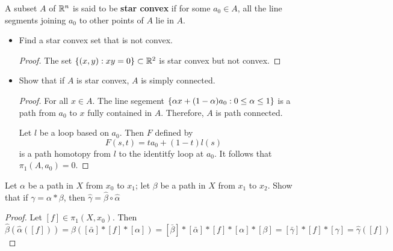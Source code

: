 \documentclass[12pt,a4paper]{article}
\begin{document}
    \begin{ex}
        A subset $A$ of $\mathbb{R}^n$ is said to be \textbf{star convex} if for some $a_0\in A$, all the line segments joining $a_0$ to other points of $A$ lie in $A$.
        \begin{itemize}
            \item Find a star convex set that is not convex.
            \begin{proof}
                The set $\left\{ (x,y):xy=0 \right\}\subset\mathbb{R}^2$ is star convex but not convex.
            \end{proof}
            \item Show that if $A$ is star convex, $A$ is simply connected.
            \begin{proof}
                For all $x\in A$. The line segement $\left\{ \alpha x+(1-\alpha)a_0:0\leq\alpha\leq1 \right\}$ is a path from $a_0$ to $x$ fully contained in $A$. Therefore, $A$ is path connected.

                Let $l$ be a loop based on $a_0$. Then $F$ defined by
                \[
                    F(s,t)=ta_0+(1-t)l(s)
                \]
                is a path homotopy from $l$ to the identitfy loop at $a_0$. It follows that $\pi_1(A,a_0)=0$.
            \end{proof}
        \end{itemize}
    \end{ex}
    \bigskip

    \begin{ex}
        Let $\alpha$ be a path in $X$ from $x_0$ to $x_1$; let $\beta$ be a path in $X$ from $x_1$ to $x_2$. Show that if $\gamma=\alpha*\beta$, then $\hat{\gamma}=\hat{\beta}\circ\hat{\alpha}$
    \end{ex}
    \begin{proof}
        Let $[f]\in \pi_1(X,x_0)$. Then
        \[
            \hat{\beta}(\hat{\alpha}([f]))=\hat{\beta}([\bar{\alpha}]*[f]*[\alpha])=[\bar{\beta}]*[\bar{\alpha}]*[f]*[\alpha]*[\beta]=[\bar{\gamma}]*[f]*[\gamma]=\hat{\gamma}([f])
        \]
    \end{proof}
    \bigskip
\end{document}
